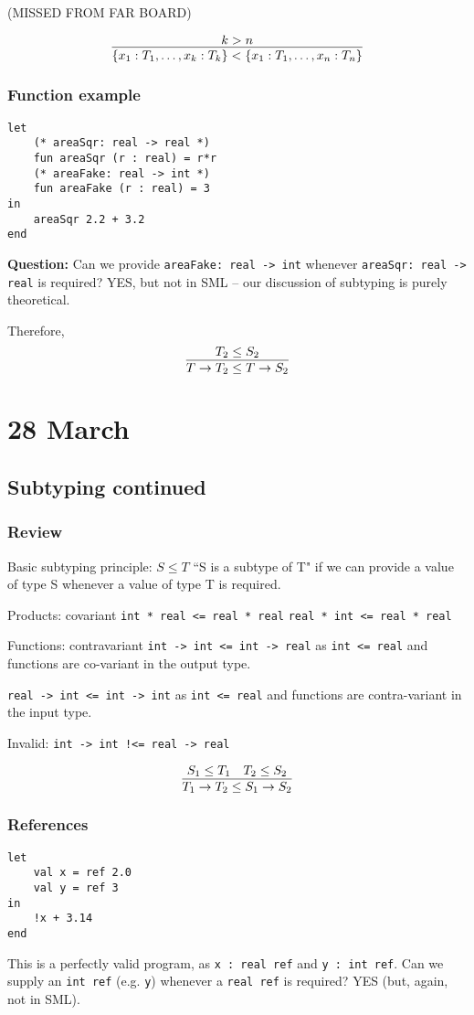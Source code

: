 \documentclass[11pt]{article}
\begin{document}
(MISSED FROM FAR BOARD)

\[
    \infer{\{x_1 : T_1, \dots, x_k : T_k\} < \{x_1 : T_1, \dots, x_n : T_n\}}{
        k > n
    }
\]

\subsubsection{Function example}
\begin{verbatim}
let
    (* areaSqr: real -> real *)
    fun areaSqr (r : real) = r*r
    (* areaFake: real -> int *)
    fun areaFake (r : real) = 3
in
    areaSqr 2.2 + 3.2
end
\end{verbatim}

\textbf{Question:} Can we provide \verb~areaFake: real -> int~ whenever \verb~areaSqr: real -> real~ is required? YES, but not in SML -- our discussion of subtyping is purely theoretical.

Therefore,
\[
    \infer{T \rightarrow T_2 \leq T \rightarrow S_2}{T_2 \leq S_2}
\]

\section{28 March}
\subsection{Subtyping continued}
\subsubsection{Review}
Basic subtyping principle: $S \leq T$ ``S is a subtype of T" if we can provide a value of type S whenever a value of type T is required. 

Products: covariant \verb~int * real <= real * real~ \verb~real * int <= real * real~

Functions: contravariant \verb~int -> int <= int -> real~ as \verb~int <= real~ and functions are co-variant in the output type.

\verb~real -> int <= int -> int~ as \verb~int <= real~ and functions are contra-variant in the input type.

Invalid: \verb~int -> int !<= real -> real~

\[
    \infer{T_1 \rightarrow T_2 \leq S_1 \rightarrow S_2}{
        S_1 \leq T_1
        &
        T_2 \leq S_2
    }
\]

\subsubsection{References}
\begin{verbatim}
let
    val x = ref 2.0
    val y = ref 3
in
    !x + 3.14
end
\end{verbatim}
This is a perfectly valid program, as \verb~x : real ref~ and \verb~y : int ref~. Can we supply an \verb~int ref~ (e.g. \verb~y~) whenever a \verb~real ref~ is required? YES (but, again, not in SML).
\end{document}
